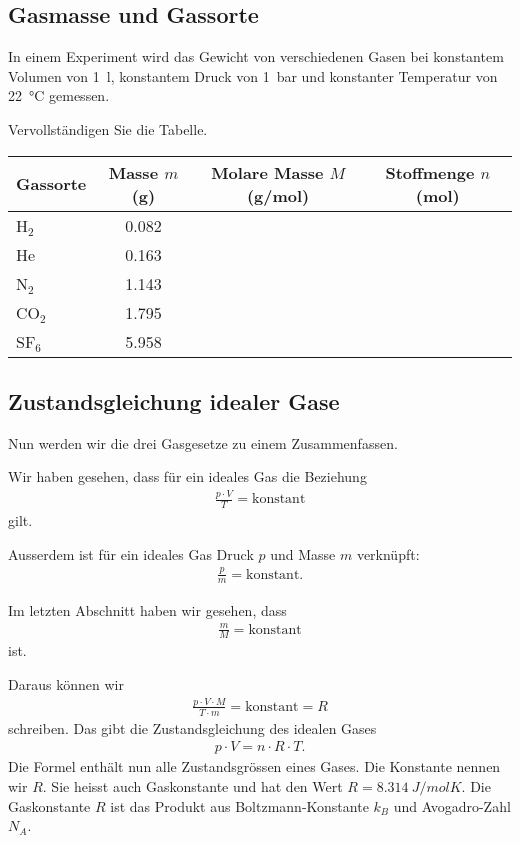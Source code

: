 \subsection{Gasmasse und Gassorte}

In einem Experiment wird das Gewicht von verschiedenen Gasen bei konstantem Volumen von \SI{1}{l},
konstantem Druck von \SI{1}{bar} und konstanter Temperatur von \SI{22}{\celsius} gemessen.

Vervollständigen Sie die Tabelle.
\begin{center}
\begin{tabular}{lccc}
	Gassorte  & Masse $m$ (g) & Molare Masse $M$ (g/mol)  & Stoffmenge $n$ (mol)\\\hline
	H$_2$     & \num{0.082}   & &\\
	He        & \num{0.163}   & &\\
	N$_2$     & \num{1.143}   & &\\
	CO$_2$    & \num{1.795}   & &\\
	SF$_6$    & \num{5.958}   & &\\
\end{tabular}
\end{center}

\subsection{Zustandsgleichung idealer Gase}
Nun werden wir die drei Gasgesetze zu einem Zusammenfassen.

Wir haben gesehen, dass für ein ideales Gas die Beziehung
\begin{eqnarray*}
	\frac{p\cdot V}{T} = \text{konstant}
\end{eqnarray*}
gilt.

Ausserdem ist für ein ideales Gas Druck $p$ und Masse $m$ verknüpft:
\begin{eqnarray*}
	\frac{p}{m}=\text{konstant}\text{.}
\end{eqnarray*}

Im letzten Abschnitt haben wir gesehen, dass
\begin{eqnarray*}
	\frac{m}{M}= \text{konstant}
\end{eqnarray*}
ist.

Daraus können wir
\begin{eqnarray*}
	\frac{p\cdot V \cdot M}{T\cdot m} = \text{konstant} = R
\end{eqnarray*}
schreiben. 
Das gibt die Zustandsgleichung des idealen Gases
\begin{eqnarray*}
	p\cdot V=n\cdot R\cdot T\text{.}
\end{eqnarray*}
Die Formel enthält nun alle Zustandsgrössen eines Gases. Die Konstante nennen wir $R$.
Sie heisst auch Gaskonstante und hat den Wert $R=\SI{8.314}{J/mol K}$.
Die Gaskonstante $R$ ist das Produkt aus Boltzmann-Konstante $k_B$ und Avogadro-Zahl $N_A$. 

